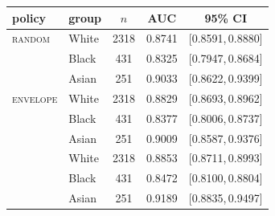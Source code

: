 \begin{tabular}{llccc}
\toprule
policy & group & $n$ & AUC & 95\% CI \\
\midrule
\textsc{random} & White & 2318 & 0.8741 & [0.8591,\,0.8880] \\
 & Black & 431 & 0.8325 & [0.7947,\,0.8684] \\
 & Asian & 251 & 0.9033 & [0.8622,\,0.9399] \\
\addlinespace
\textsc{envelope} & White & 2318 & 0.8829 & [0.8693,\,0.8962] \\
 & Black & 431 & 0.8377 & [0.8006,\,0.8737] \\
 & Asian & 251 & 0.9009 & [0.8587,\,0.9376] \\
\addlinespace
\ArmBest{} & White & 2318 & 0.8853 & [0.8711,\,0.8993] \\
 & Black & 431 & 0.8472 & [0.8100,\,0.8804] \\
 & Asian & 251 & 0.9189 & [0.8835,\,0.9497] \\
\bottomrule
\end{tabular}
